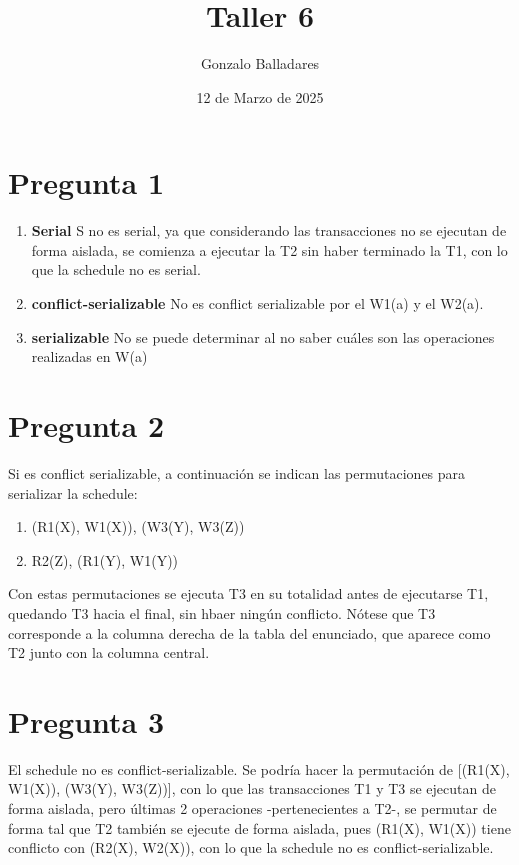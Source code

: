 \documentclass{article}
\title{Taller 6}
\author{Gonzalo Balladares}
\date{12 de Marzo de 2025}
\begin{document}
\maketitle

\section{Pregunta 1}

\begin{enumerate}
    \item \textbf{Serial} S no es serial, ya que considerando las transacciones no se ejecutan de forma aislada, se comienza a ejecutar la T2 sin haber terminado la T1, con lo que la schedule no es serial.
    \item \textbf{conflict-serializable} No es conflict serializable por el W1(a) y el W2(a).
    \item \textbf{serializable} No se puede determinar al no saber cuáles son las operaciones realizadas en W(a)
\end{enumerate}

\section{Pregunta 2}
Si es conflict serializable, a continuación se indican las permutaciones para serializar la schedule:
\begin{enumerate}
    \item (R1(X), W1(X)), (W3(Y), W3(Z))
    \item R2(Z), (R1(Y), W1(Y))
\end{enumerate}

Con estas permutaciones se ejecuta T3 en su totalidad antes de ejecutarse T1, quedando T3 hacia el final, sin hbaer ningún conflicto.
Nótese que T3 corresponde a la columna derecha de la tabla del enunciado, que aparece como T2 junto con la columna central.

\section{Pregunta 3}
El schedule no es conflict-serializable. Se podría hacer la permutación de [(R1(X), W1(X)), (W3(Y), W3(Z))], con lo que las transacciones T1 y T3 se ejecutan de forma aislada, pero últimas 2 operaciones -pertenecientes a T2-, se permutar de forma tal que T2 también se ejecute de forma aislada, pues (R1(X), W1(X)) tiene conflicto con (R2(X), W2(X)), con lo que la schedule no es conflict-serializable.
\end{document}
